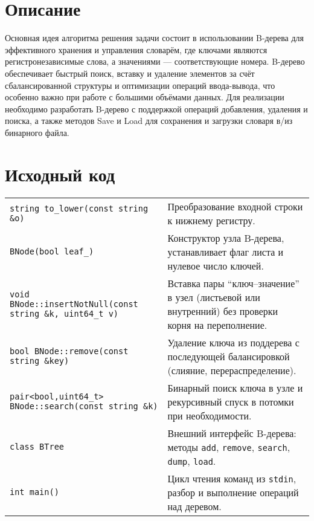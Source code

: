 \section{Описание}
Основная идея алгоритма решения задачи состоит в использовании B-дерева для эффективного хранения и управления словарём, где ключами являются регистронезависимые слова, а значениями — соответствующие номера.
B-дерево обеспечивает быстрый поиск, вставку и удаление элементов за счёт сбалансированной структуры и оптимизации операций ввода-вывода, что особенно важно при работе с большими объёмами данных.
Для реализации необходимо разработать B-дерево с поддержкой операций добавления, удаления и поиска, а также методов Save и Load для сохранения и загрузки словаря в/из бинарного файла.

\pagebreak

\section{Исходный код}
\begin{longtable}{|p{7.5cm}|p{7.5cm}|}
\hline
\rowcolor{lightgray}
\multicolumn{2}{|c|}{btree.cpp}\\
\hline
\texttt{string to\_lower(const string \&o)} & Преобразование входной строки к нижнему регистру.\\
\hline
\texttt{BNode(bool leaf\_)} & Конструктор узла B-дерева, устанавливает флаг листа и нулевое число ключей.\\
\hline
\texttt{void BNode::insertNotNull(const string \&k, uint64\_t v)} & Вставка пары \enquote{ключ–значение} в узел (листьевой или внутренний) без проверки корня на переполнение.\\
\hline
\texttt{bool BNode::remove(const string \&key)} & Удаление ключа из поддерева с последующей балансировкой (слияние, перераспределение).\\
\hline
\texttt{pair<bool,uint64\_t> BNode::search(const string \&k)} & Бинарный поиск ключа в узле и рекурсивный спуск в потомки при необходимости.\\
\hline
\texttt{class BTree} & Внешний интерфейс B-дерева: методы \texttt{add}, \texttt{remove}, \texttt{search}, \texttt{dump}, \texttt{load}.\\
\hline
\texttt{int main()} & Цикл чтения команд из \texttt{stdin}, разбор и выполнение операций над деревом.\\
\hline
\end{longtable}

